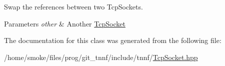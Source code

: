 Swap the references between two Tcp\+Sockets. 


\begin{DoxyParams}{Parameters}
{\em other} & Another \hyperlink{classtnnf_1_1_tcp_socket}{Tcp\+Socket} \\
\hline
\end{DoxyParams}


The documentation for this class was generated from the following file\+:\begin{DoxyCompactItemize}
\item 
/home/smoke/files/prog/git\+\_\+tnnf/include/tnnf/\hyperlink{_tcp_socket_8hpp}{Tcp\+Socket.\+hpp}\end{DoxyCompactItemize}
